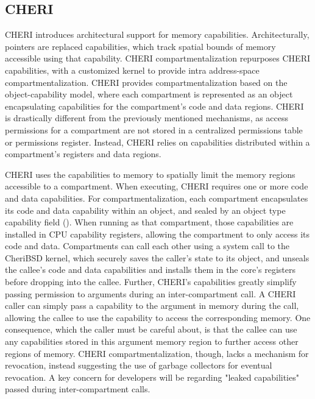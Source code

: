 \subsection{CHERI}
CHERI introduces architectural support for memory capabilities.
Architecturally, pointers are replaced capabilities, which track 
spatial bounds of memory accessible using that capability. 
CHERI compartmentalization repurposes CHERI capabilities, with a customized
kernel to provide intra address-space compartmentalization.
CHERI provides compartmentalization based on the object-capability model, 
where each compartment is represented as an object encapsulating capabilities
for the compartment's code and data regions.
CHERI is drastically different from the previously mentioned mechanisms,
as access permissions for a compartment are not stored in a centralized
permissions table or permissions register.
Instead, CHERI relies on capabilities distributed within a compartment's 
registers and data regions.

CHERI uses the capabilities to memory to spatially limit the memory regions
accessible to a compartment.
When executing, CHERI requires one or more code and data capabilities. 
For compartmentalization, each compartment encapsulates its code and data
capability within an object, and sealed by an object type capability 
field (). 
When running as that compartment, those capabilities are installed in CPU
capability registers, allowing the compartment to only access its code and data.
Compartments can call each other using a system call to the CheriBSD kernel,
which securely saves the caller's state to its object, and unseals the
callee's code and data capabilities and installs them in the core's registers 
before dropping into the callee.
Further, CHERI's capabilities greatly simplify passing permission to arguments
during an inter-compartment call.
A CHERI caller can simply pass a capability to the argument in memory during
the call, allowing the callee to use the capability to access the corresponding
memory.
One consequence, which the caller must be careful about, is that the callee can
use any capabilities stored in this argument memory region to further access other
regions of memory.
CHERI compartmentalization, though, lacks a mechanism for revocation,
instead suggesting the use of garbage collectors for eventual revocation.
A key concern for developers will be regarding "leaked capabilities" passed during
inter-compartment calls.

